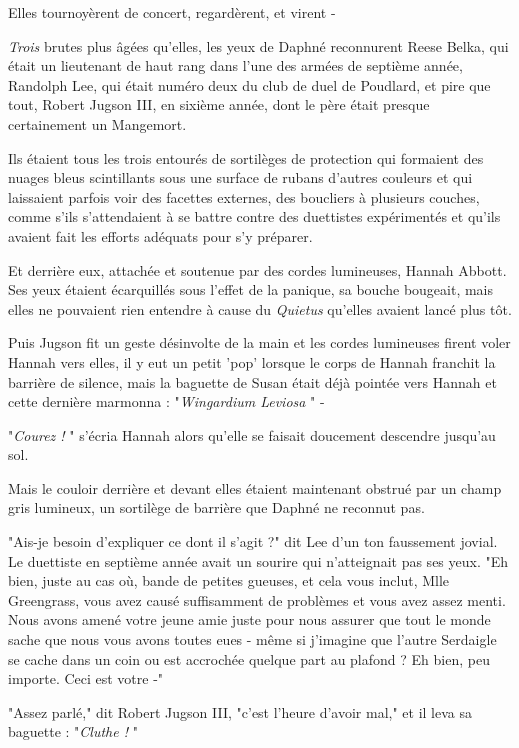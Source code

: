 Elles tournoyèrent de concert, regardèrent, et virent -

\emph{Trois } brutes plus âgées qu'elles, les yeux de Daphné reconnurent Reese Belka, qui était un lieutenant de haut rang dans l'une des armées de septième année, Randolph Lee, qui était numéro deux du club de duel de Poudlard, et pire que tout, Robert Jugson III, en sixième année, dont le père était presque certainement un Mangemort.

Ils étaient tous les trois entourés de sortilèges de protection qui formaient des nuages bleus scintillants sous une surface de rubans d'autres couleurs et qui laissaient parfois voir des facettes externes, des boucliers à plusieurs couches, comme s'ils s'attendaient à se battre contre des duettistes expérimentés et qu'ils avaient fait les efforts adéquats pour s'y préparer.

Et derrière eux, attachée et soutenue par des cordes lumineuses, Hannah Abbott. Ses yeux étaient écarquillés sous l'effet de la panique, sa bouche bougeait, mais elles ne pouvaient rien entendre à cause du \emph{Quietus}  qu'elles avaient lancé plus tôt.

Puis Jugson fit un geste désinvolte de la main et les cordes lumineuses firent voler Hannah vers elles, il y eut un petit 'pop' lorsque le corps de Hannah franchit la barrière de silence, mais la baguette de Susan était déjà pointée vers Hannah et cette dernière marmonna : "\emph{Wingardium Leviosa} " -

"\emph{Courez !} " s'écria Hannah alors qu'elle se faisait doucement descendre jusqu'au sol.

Mais le couloir derrière et devant elles étaient maintenant obstrué par un champ gris lumineux, un sortilège de barrière que Daphné ne reconnut pas.

"Ais-je besoin d'expliquer ce dont il s'agit ?" dit Lee d'un ton faussement jovial. Le duettiste en septième année avait un sourire qui n'atteignait pas ses yeux. "Eh bien, juste au cas où, bande de petites gueuses, et cela vous inclut, Mlle Greengrass, vous avez causé suffisamment de problèmes et vous avez assez menti. Nous avons amené votre jeune amie juste pour nous assurer que tout le monde sache que nous vous avons toutes eues - même si j'imagine que l'autre Serdaigle se cache dans un coin ou est accrochée quelque part au plafond ? Eh bien, peu importe. Ceci est votre -"

"Assez parlé," dit Robert Jugson III, "c'est l'heure d'avoir mal," et il leva sa baguette : "\emph{Cluthe !} "

